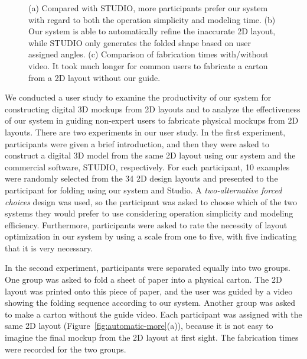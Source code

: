  
 
 \begin{figure}  
 	\centering
 	\vspace{2ex}
 	\vspace{2ex}
 	\caption{(a) Compared with STUDIO, more participants prefer our system with regard to both the operation simplicity and modeling time. (b) Our system is able to automatically refine the inaccurate 2D layout, while STUDIO only generates the folded shape based on user assigned angles. (c) Comparison of fabrication times with/without video. It took much longer for common users to fabricate a carton from a 2D layout without our guide.}
 	\label{fig:userstudy}
 \end{figure}
 
 
 
We conducted a user study to examine the productivity of our system for constructing digital 3D mockups from 2D layouts and to analyze the effectiveness of our system in guiding non-expert users to fabricate physical mockups from 2D layouts. 
%
There are two experiments in our user study.
% 
In the first experiment, participants were given a brief introduction, and then they were asked to construct a digital 3D model from the same 2D layout using our system and the commercial software, STUDIO, respectively.
For each participant, 10 examples were randomly selected from the 34 2D design layouts and presented to the participant for folding using our system and Studio.
A \emph{two-alternative forced choices} design was used, so the participant was asked to choose which of the two systems they would prefer to use considering operation simplicity and modeling efficiency. 
%
Furthermore, participants were asked to rate the necessity of layout optimization in our system by using a scale from one to five, with five indicating that it is very necessary.

%
In the second experiment, participants were separated equally into two groups. One group was asked to fold a sheet of paper into a physical carton. The 2D layout was printed onto this piece of paper, and the user was guided by a video showing the folding sequence according to our system. Another group was asked to make a carton without the guide video. 
Each participant was assigned with the same 2D layout (Figure~\ref{fig:automatic-more}(a)), because it is not easy to imagine the final mockup from the 2D layout at first sight.
%
The fabrication times were recorded for the two groups.
%

